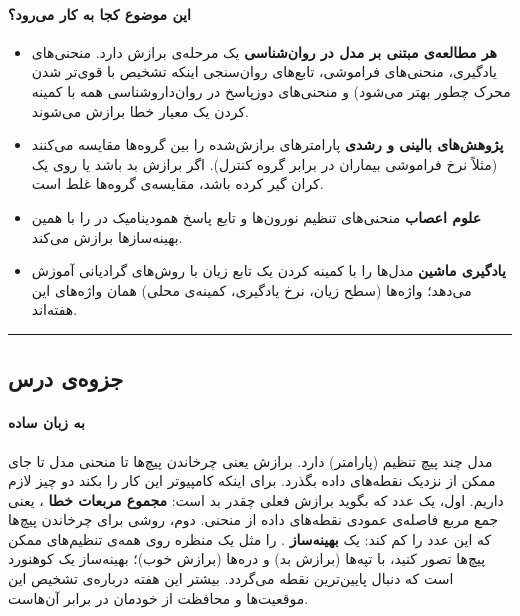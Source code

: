 \paragraph{این موضوع کجا به کار می‌رود؟}

\begin{itemize}
\tightlist
\item
  \textbf{هر مطالعه‌ی مبتنی بر مدل در روان‌شناسی} یک مرحله‌ی برازش دارد.
  منحنی‌های یادگیری، منحنی‌های فراموشی، تابع‌های روان‌سنجی  اینکه تشخیص با قوی‌تر شدن محرک چطور بهتر می‌شود) و منحنی‌های
  دوز\lr{--}پاسخ در روان‌داروشناسی همه با کمینه کردن یک معیار خطا برازش
  می‌شوند.
\item
  \textbf{پژوهش‌های بالینی و رشدی} پارامترهای برازش‌شده را بین گروه‌ها
  مقایسه می‌کنند (مثلاً نرخ فراموشی بیماران در برابر گروه کنترل). اگر
  برازش بد باشد یا روی یک کران گیر کرده باشد، مقایسه‌ی گروه‌ها غلط است.
\item
  \textbf{علوم اعصاب} منحنی‌های تنظیم  نورون‌ها و تابع
  پاسخ همودینامیک در  را با همین بهینه‌سازها برازش می‌کند.
\item
  \textbf{یادگیری ماشین} مدل‌ها را با کمینه کردن یک تابع زیان 
  با روش‌های گرادیانی آموزش می‌دهد؛ واژه‌ها (سطح زیان، نرخ یادگیری، کمینه‌ی
  محلی) همان واژه‌های این هفته‌اند.
\end{itemize}

\begin{center}\rule{0.5\linewidth}{0.5pt}\end{center}


\subsection{جزوه‌ی درس}

\paragraph{به زبان ساده}

مدل چند پیچ تنظیم (پارامتر) دارد. برازش یعنی چرخاندن پیچ‌ها تا منحنی مدل
تا جای ممکن از نزدیک نقطه‌های داده بگذرد. برای اینکه کامپیوتر این کار را
بکند دو چیز لازم داریم. اول، یک عدد که بگوید برازش فعلی چقدر بد است:
\textbf{مجموع مربعات خطا }، یعنی جمع مربع فاصله‌ی عمودی نقطه‌های
داده از منحنی. دوم، روشی برای چرخاندن پیچ‌ها که این عدد را کم کند: یک
\textbf{بهینه‌ساز }.  را مثل یک منظره روی همه‌ی
تنظیم‌های ممکن پیچ‌ها تصور کنید، با تپه‌ها (برازش بد) و دره‌ها (برازش خوب)؛
بهینه‌ساز یک کوهنورد است که دنبال پایین‌ترین نقطه می‌گردد. بیشتر این هفته
درباره‌ی تشخیص این موقعیت‌ها و محافظت از خودمان در برابر آن‌هاست.

